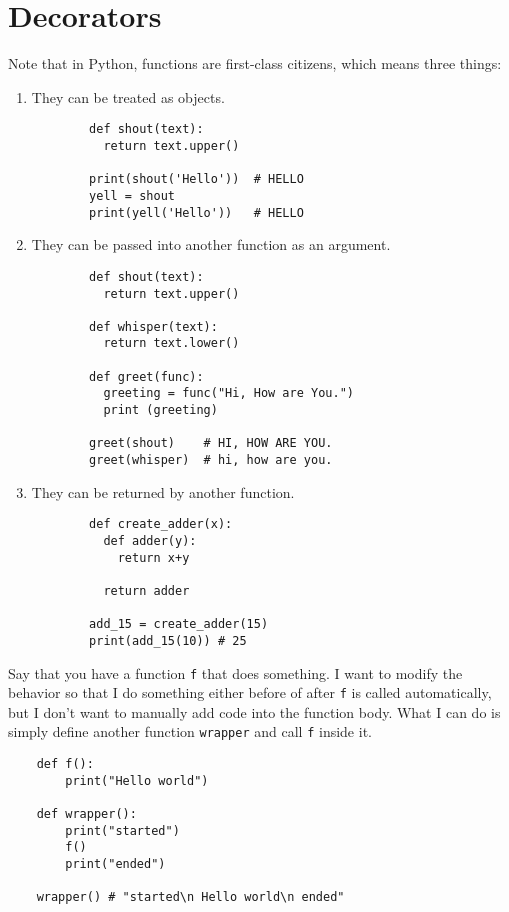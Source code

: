 \section{Decorators}

  Note that in Python, functions are first-class citizens, which means three things: 
  \begin{enumerate}
    \item They can be treated as objects. 
      \begin{lstlisting}
        def shout(text): 
          return text.upper() 

        print(shout('Hello'))  # HELLO 
        yell = shout 
        print(yell('Hello'))   # HELLO
      \end{lstlisting}
    \item They can be passed into another function as an argument. 
      \begin{lstlisting}
        def shout(text): 
          return text.upper() 

        def whisper(text): 
          return text.lower() 

        def greet(func): 
          greeting = func("Hi, How are You.")
          print (greeting) 

        greet(shout)    # HI, HOW ARE YOU.
        greet(whisper)  # hi, how are you. 
      \end{lstlisting}
    \item They can be returned by another function. 
      \begin{lstlisting}
        def create_adder(x): 
          def adder(y): 
            return x+y 

          return adder 

        add_15 = create_adder(15) 
        print(add_15(10)) # 25 
      \end{lstlisting}
  \end{enumerate}

  Say that you have a function \texttt{f} that does something. I want to modify the behavior so that I do something either before of after \texttt{f} is called automatically, but I don't want to manually add code into the function body. What I can do is simply define another function \texttt{wrapper} and call \texttt{f} inside it. 
  \begin{lstlisting}
    def f(): 
        print("Hello world") 

    def wrapper(): 
        print("started") 
        f()
        print("ended") 

    wrapper() # "started\n Hello world\n ended"
  \end{lstlisting}


